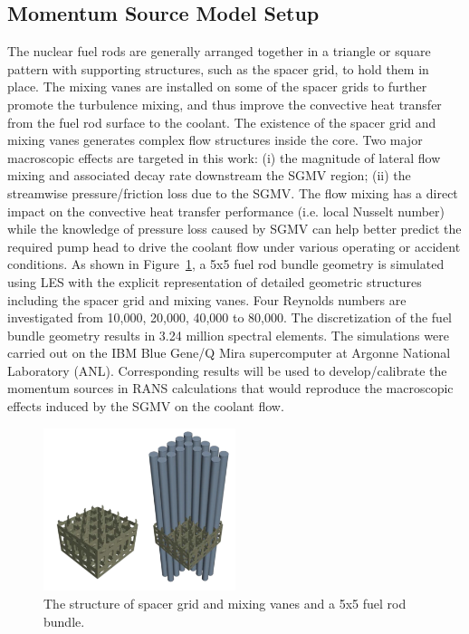 \subsection{Momentum Source Model Setup}
\label{sec:msm2}

The nuclear fuel rods are generally arranged together in a triangle or square pattern with supporting structures, such as the spacer grid, to hold them in place. 
The mixing vanes are installed on some of the spacer grids to further promote the turbulence mixing, and thus improve the convective heat transfer from the fuel rod surface to the coolant. 
The existence of the spacer grid and mixing vanes generates complex flow structures inside the core. Two major macroscopic effects are targeted in this work: 
(i) the magnitude of lateral flow mixing and associated decay rate downstream the SGMV region; 
(ii) the streamwise pressure/friction loss due to the SGMV. 
The flow mixing has a direct impact on the convective heat transfer performance (i.e. local Nusselt number) while the knowledge of pressure loss caused by SGMV can help better predict the required pump head to drive the coolant flow under various operating or accident conditions. 
As shown in Figure~\ref{fig:sgmvcad}, a 5x5 fuel rod bundle geometry is simulated using LES with the explicit representation of detailed geometric structures including the spacer grid and mixing vanes. 
Four Reynolds numbers are investigated from 10,000, 20,000, 40,000 to 80,000. 
The discretization of the fuel bundle geometry results in 3.24 million spectral elements. The simulations were carried out on the IBM Blue Gene/Q Mira supercomputer at Argonne National Laboratory (ANL).
Corresponding results will be used to develop/calibrate the momentum sources in RANS calculations that would reproduce the macroscopic effects induced by the SGMV on the coolant flow.

\begin{figure}[!ht]
\centering
\includegraphics[width=0.5\textwidth]{./figures/3DModel_of_SGMV.png}
\caption{The structure of spacer grid and mixing vanes and a 5x5 fuel rod bundle. }
\label{fig:sgmvcad}
\end{figure}

